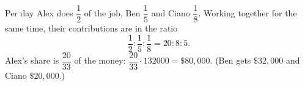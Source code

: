 Per day Alex does $\dfrac{1}{2}$ of the job, Ben $\dfrac{1}{5}$ and Ciano $\dfrac{1}{8}$. Working together for the same time, their contributions are in the ratio
\[
\dfrac{1}{2}:\dfrac{1}{5}:\dfrac{1}{8}=20:8:5 .
\]
Alex's share is $\dfrac{20}{33}$ of the money: $\dfrac{20}{33}\cdot132000=\boxed{\$80{,}000}$. (Ben gets $\$32{,}000$ and Ciano $\$20{,}000$.)
